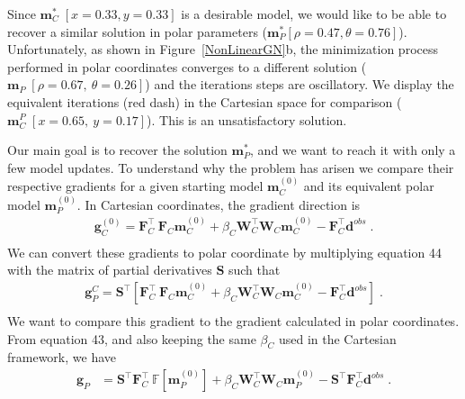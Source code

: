 \documentclass[paper]{geophysics}
\begin{document}
Since $\mathbf{m}_C^*\;[x=0.33, y=0.33]$ is a desirable model, we would like to be able to recover a similar solution in polar parameters ($\mathbf{m}_P^{*}[\rho=0.47, \theta=0.76]$). Unfortunately, as shown in Figure~\ref{NonLinearGN}b, the minimization process performed in polar coordinates converges to a different solution ($\mathbf{m}_P\;[ \rho=0.67,\:\theta=0.26]$) and the iterations steps are oscillatory.
We display the equivalent iterations (red dash) in the Cartesian space for comparison ($\mathbf{m}_C^P\;[ x=0.65,\:y=0.17]$). This is an unsatisfactory solution.

Our main goal is to recover the solution $\mathbf{m}_P^{*}$, and we want to reach it with only a few model updates.
To understand  why the problem has arisen we compare their respective gradients for a given starting model $\mathbf{m}_C^{(0)}$ and its equivalent polar model $\mathbf{m}_P^{(0)}$. In Cartesian coordinates, the gradient direction is
\begin{equation}\label{gradC_0}
\begin{split}
\mathbf{g}_C^{(0)} = \mathbf{F}_C^\top \:\mathbf{F}_C\mathbf{m}_C^{(0)} + \beta_C \mathbf{W}_C^\top\mathbf{W}_C \mathbf{m}_C^{(0)} - \mathbf{F}_C^\top \mathbf{d}^{obs}\;. \\
\end{split}
\end{equation}
We can convert these gradients to polar coordinate by multiplying equation 44 with the matrix of partial derivatives $\mathbf{S}$ such that
\begin{equation}\label{gradCtoP}
\begin{split}
\mathbf{g}_P^C = \mathbf{S}^\top \left[ \mathbf{F}_C^\top \:\mathbf{F}_C\mathbf{m}_C^{(0)} + \beta_C \mathbf{W}_C^\top\mathbf{W}_C \mathbf{m}_C^{(0)} - \mathbf{F}_C^\top \mathbf{d}^{obs} \right] \;.\\
\end{split}
\end{equation}
We want to compare this gradient to the gradient calculated in polar coordinates. From equation 43, and also keeping the same $\beta_C$ used in the Cartesian framework, we have
\begin{equation}\label{gradP}
\begin{split}
\mathbf{g}_P &= \mathbf{S}^\top \mathbf{F}_C^\top \:\mathbb{F}[\mathbf{m}_P^{(0)}] + \beta_C \mathbf{W}_C^\top\mathbf{W}_C \mathbf{m}_P^{(0)} - \mathbf{S}^\top \mathbf{F}_C^\top \mathbf{d}^{obs}\;.
\end{split}
\end{equation}
\end{document}
